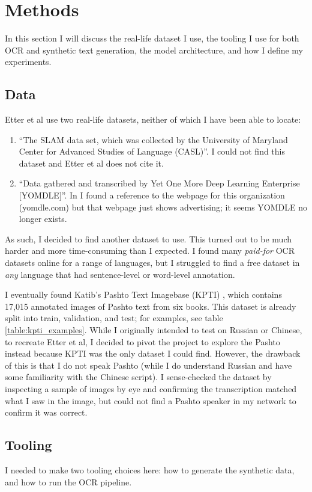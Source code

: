 \documentclass[twocolumn,11pt]{extarticle}
\begin{document}
\section{Methods}
In this section I will discuss the real-life dataset I use, the tooling I use for both OCR and synthetic text generation, the model architecture, and how I define my experiments. 

\subsection{Data}
Etter et al use two real-life datasets, neither of which I have been able to locate: 
\begin{enumerate}
    \item ``The SLAM data set, which was collected by the University of Maryland Center for Advanced Studies of Language (CASL)''. I could not find this dataset and Etter et al does not cite it. 
    \item ``Data gathered and transcribed by Yet One More Deep Learning Enterprise [YOMDLE]''. In \cite{lawrie_building_2020} I found a reference to the webpage for this organization (yomdle.com) but that webpage just shows advertising; it seems YOMDLE no longer exists. 
\end{enumerate}

As such, I decided to find another dataset to use. This turned out to be much harder and more time-consuming than I expected. I found many \textit{paid-for} OCR datasets online for a range of languages, but I struggled to find a free dataset in \textit{any} language that had sentence-level or word-level annotation. 

I eventually found Katib's Pashto Text Imagebase (KPTI) \cite{ahmad_kpti_2016}, which contains 17,015 annotated images of Pashto text from six books. This dataset is already split into train, validation, and test; for examples, see table \ref{table:kpti_examples}. While I originally intended to test on Russian or Chinese, to recreate Etter et al, I decided to pivot the project to explore the Pashto instead because KPTI was the only dataset I could find. However, the drawback of this is that I do not speak Pashto (while I do understand Russian and have some familiarity with the Chinese script). I sense-checked the dataset by inspecting a sample of images by eye and confirming the transcription matched what I saw in the image, but could not find a Pashto speaker in my network to confirm it was correct.

\subsection{Tooling}
I needed to make two tooling choices here: how to generate the synthetic data, and how to run the OCR pipeline. 
\end{document}
